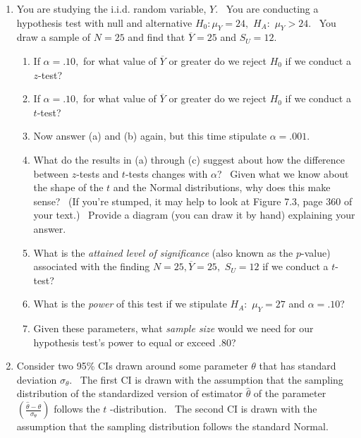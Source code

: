 \documentclass[11pt]{article}
\begin{document}
\begin{enumerate}
\item You are studying the i.i.d. random variable, $Y.$ \ You are conducting
a hypothesis test with null and alternative $H_{0}:\mu _{Y}=24,$ $H_{A}:$ $%
\mu _{Y}>24.$ \ You draw a sample of $N=25$ and find that $\overline{Y}=25$
and $S_{U}=12.$

\begin{enumerate}
\item If $\alpha =.10,$ for what value of $\overline{Y}$ or greater do we
reject $H_{0}$ if we conduct a $z$-test? \ 

\item If $\alpha =.10,$ for what value of $\overline{Y}$ or greater do we
reject $H_{0}$ if we conduct a $t$-test? \ 

\item Now answer (a) and (b) again, but this time stipulate $\alpha =.001.$

\item What do the results in (a) through (c) suggest about how the
difference between $z$-tests and $t$-tests changes with $\alpha $? \ Given
what we know about the shape of the $t$ and the Normal distributions, why
does this make sense? \ (If you're stumped, it may help to look at Figure
7.3, page 360 of your text.) \ Provide a diagram (you can draw it by hand)
explaining your answer. \ 

\item What is the \textit{attained level of significance }(also known as the 
$p$-value) associated with the finding $N=25,\overline{Y}=25,$ $S_{U}=12$ if
we conduct a $t$-test?

\item What is the \textit{power} of this test if we stipulate $H_{A}:$ $\mu
_{Y}=27$ and $\alpha =.10$?

\item Given these parameters, what \textit{sample size }would we need for
our hypothesis test's power to equal or exceed $.80$?\medskip
\end{enumerate}

\item Consider two 95\% CIs drawn around some parameter $\theta $ that has
standard deviation $\sigma _{\theta }.$ \ The first CI is drawn with the
assumption that the sampling distribution of the standardized version of
estimator $\widehat{\theta }$ of the parameter $\left( \frac{\widehat{\theta 
}-\theta }{\sigma \widehat{_{\theta }}}\right) $ follows the $t$%
-distribution. \ The second CI is drawn with the assumption that the
sampling distribution follows the standard Normal. \ 


\end{enumerate}
\end{document}
